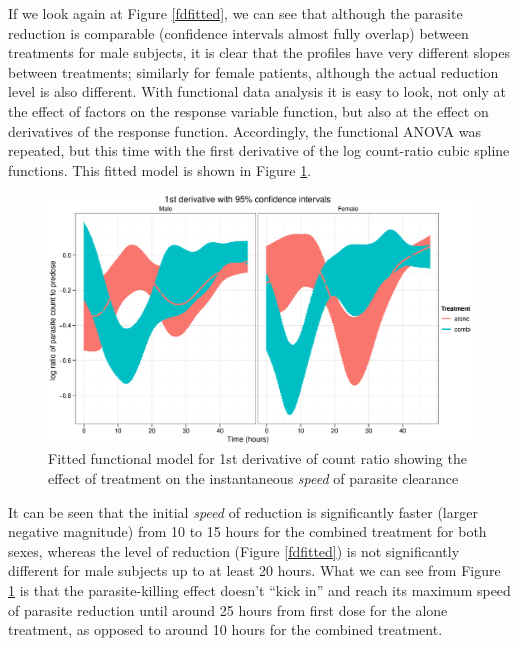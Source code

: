 If we look again at Figure \ref{fdfitted}, we can see that although the parasite reduction is comparable (confidence intervals almost fully overlap) between treatments for male subjects, it is clear that the profiles have very different slopes between treatments; similarly for female patients, although the actual reduction level is also different. With functional data analysis it is easy to look, not only at the effect of factors on the response variable function, but also at the effect on derivatives of the response function. Accordingly, the functional ANOVA was repeated, but this time with the first derivative of the log count-ratio cubic spline functions. This fitted model is shown in Figure \ref{fdspeed}. 
\begin{figure}[p]
\includegraphics[width=150mm]{lprr2ispeed.eps} 
\caption{Fitted functional model for 1st derivative of count ratio showing the effect of treatment on the instantaneous \emph{speed} of parasite clearance}
\label{fdspeed}
\end{figure}

It can be seen that the initial \emph{speed} of reduction is significantly faster (larger negative magnitude) from 10 to 15 hours for the combined treatment for both sexes, whereas the level of reduction (Figure \ref{fdfitted}) is not significantly different for male subjects up to at least 20 hours. What we can see from Figure \ref{fdspeed} is that the parasite-killing effect doesn't ``kick in'' and reach its maximum speed of parasite reduction until around 25 hours from first dose for the alone treatment, as opposed to around 10 hours for the combined treatment.
\clearpage
